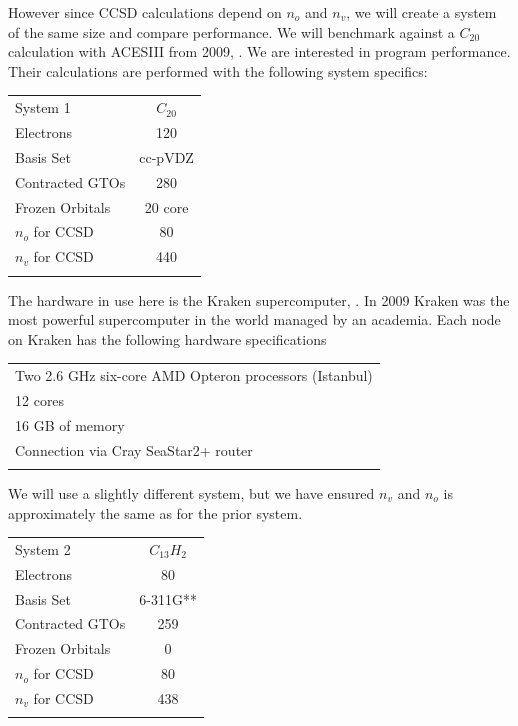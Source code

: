 \documentclass[a4paper,norsk,11pt,twoside]{report}
\begin{document}
However since CCSD calculations depend on $n_o$ and $n_v$, we will create a system of the same size and compare performance. We will benchmark against a $C_{20}$ calculation with ACESIII from 2009, \cite{aces_non_ref}. We are interested in program performance. Their calculations are performed with the following system specifics: \\

\begin{center}
\begin{tabular}{ l c}
	\hline
  	System 1 & $C_{20}$\\
  	Electrons & 120 \\
  	Basis Set & cc-pVDZ\\
  	Contracted GTOs & 280 \\
  	Frozen Orbitals & 20 core\\
  	$n_o$ for CCSD & 80\\
  	$n_v$ for CCSD & 440\\ \hline
  	\\
	\end{tabular}
\end{center}

The hardware in use here is the Kraken supercomputer, \cite{kraken_citation}. In 2009 Kraken was the most powerful supercomputer in the world managed by an academia. Each node on Kraken has the following hardware specifications

\begin{center}
\begin{tabular}{ l }
	\hline
  	Two 2.6 GHz six-core AMD Opteron processors (Istanbul)\\
    12 cores\\
    16 GB of memory\\
    Connection via Cray SeaStar2+ router\\ \hline
  	\\
	\end{tabular}
\end{center}

We will use a slightly different system, but we have ensured $n_v$ and $n_o$ is approximately the same as for the prior system.

\begin{center}
\begin{tabular}{ l c}
	\hline
  	System 2 & $C_{13} H_2$\\
  	Electrons & 80 \\
  	Basis Set & 6-311G** \\
  	Contracted GTOs & 259 \\
  	Frozen Orbitals & 0 \\
  	$n_o$ for CCSD & 80 \\
  	$n_v$ for CCSD & 438 \\ \hline
  	\\
	\end{tabular}
\end{center}
\end{document}
